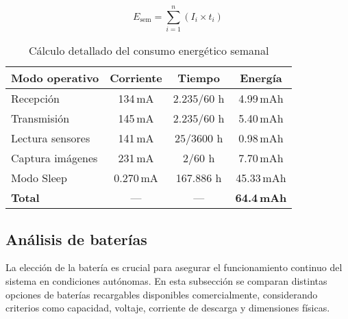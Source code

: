 \begin{equation}
E_{\text{sem}} = \sum_{i=1}^{n} (I_i \times t_i)
\end{equation}
    


\begin{table}[H]
\centering
\renewcommand{\arraystretch}{1.5}
\caption{Cálculo detallado del consumo energético semanal}
\begin{tabular}{|l|c|c|c|}
\hline
\textbf{Modo operativo} & \textbf{Corriente} & \textbf{Tiempo} & \textbf{Energía} \\
\hline
Recepción               & 134\,mA & $2.235/60$ h & 4.99\,mAh \\
Transmisión             & 145\,mA & $2.235/60$ h & 5.40\,mAh \\
Lectura sensores        & 141\,mA & $25/3600$ h  & 0.98\,mAh \\
Captura imágenes        & 231\,mA & $2/60$ h     & 7.70\,mAh \\
Modo Sleep              & 0.270\,mA & 167.886 h   & 45.33\,mAh \\
\hline
\textbf{Total}          & — & — & \textbf{64.4\,mAh} \\
\hline
\end{tabular}
\label{tab:consumo_actualizado}
\end{table}

\subsection{Análisis de baterías}
La elección de la batería es crucial para asegurar el funcionamiento continuo del sistema en condiciones autónomas. En esta subsección se comparan distintas opciones de baterías recargables disponibles comercialmente, considerando criterios como capacidad, voltaje, corriente de descarga y dimensiones físicas.

